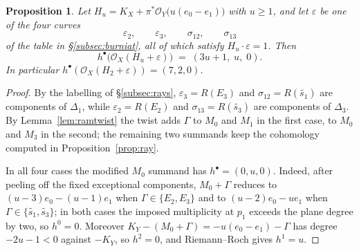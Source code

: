\documentclass[10pt,a4paper]{amsart}
\newtheorem{proposition}[theorem]{Proposition}
\newcommand{\OO}{\mathcal{O}}
\begin{document}
\begin{proposition}\label{prop:twistcoh}
Let $H_u=K_X+\pi^*\OO_Y\bigl(u(e_0-e_1)\bigr)$ with $u\ge1$, and let $\varepsilon$ be one of the four curves
\[
\varepsilon_2,\qquad \varepsilon_3,\qquad \sigma_{12},\qquad \sigma_{13}
\]
of the table in \S\ref{subsec:burniat}, all of which satisfy $H_u\cdot\varepsilon=1$. Then
\[
h^\bullet\bigl(\OO_X(H_u+\varepsilon)\bigr)\;=\;(3u+1,\;u,\;0) .
\]
In particular $h^\bullet(\OO_X(H_2+\varepsilon))=(7,2,0)$.
\end{proposition}

\begin{proof}
By the labelling of \S\ref{subsec:rays}, $\varepsilon_3=R(E_3)$ and $\sigma_{12}=R(\widetilde{s_1})$ are components of $\Delta_1$, while $\varepsilon_2=R(E_2)$ and $\sigma_{13}=R(\widetilde{s_3})$ are components of $\Delta_3$. By Lemma~\ref{lem:ramtwist} the twist adds $\Gamma$ to $M_0$ and $M_1$ in the first case, to $M_0$ and $M_3$ in the second; the remaining two summands keep the cohomology computed in Proposition~\ref{prop:ray}.

In all four cases the modified $M_0$ summand has $h^\bullet=(0,u,0)$. Indeed, after peeling off the fixed exceptional components, $M_0+\Gamma$ reduces to $(u-3)e_0-(u-1)e_1$ when $\Gamma\in\{E_2,E_3\}$ and to $(u-2)e_0-ue_1$ when $\Gamma\in\{\widetilde{s_1},\widetilde{s_3}\}$; in both cases the imposed multiplicity at $p_1$ exceeds the plane degree by two, so $h^0=0$. Moreover $K_Y-(M_0+\Gamma)=-u(e_0-e_1)-\Gamma$ has degree $-2u-1<0$ against $-K_Y$, so $h^2=0$, and Riemann--Roch gives $h^1=u$.


\end{proof}
\end{document}
